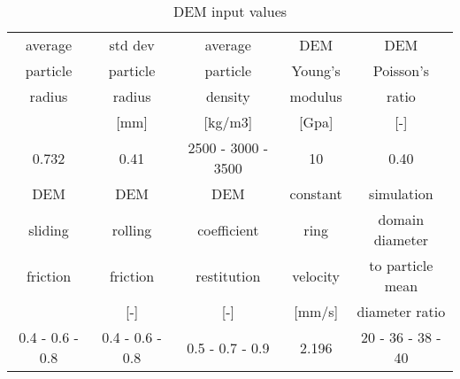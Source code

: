 \begin{table}[h]
\centering
\begin{tabular}{c|c|c|c|c}
\hline
average & std dev & average & DEM   & DEM \\
particle & particle & particle & Young's & Poisson's \\
    radius & radius & density & modulus & ratio \\
    [mm]  & [mm]  & [kg/m3] & [Gpa] & [-] \\
    \hline
    0.732 & 0.41  & 2500 - 3000 - 3500 & 10    & 0.40 \\
    \hline
    DEM   & DEM   & DEM   & constant & simulation \\
    sliding & rolling & coefficient & ring  & domain diameter \\
    friction & friction & restitution & velocity & to particle mean \\
    [-]   & [-]   & [-]   & [mm/s] & diameter ratio \\
    \hline
    0.4 - 0.6 - 0.8 & 0.4 - 0.6 - 0.8 & 0.5 - 0.7 - 0.9 & 2.196 & 20 - 36 - 38 - 40 \\

\hline
\end{tabular}
\caption{DEM input values}
\label{tab:07DEMinputvalues}
\end{table}